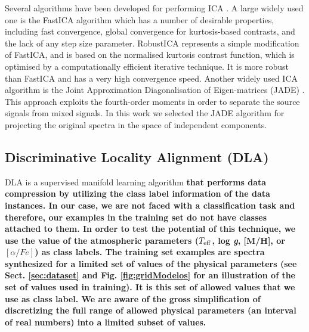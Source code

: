 \documentclass[a4paper,fleqn,usenatbib]{mnras}
\begin{document}
Several algorithms have been developed for performing ICA
\citep{bell:95,belouchrani:97,ollila:06,li:08}. A large widely used
one is the FastICA algorithm \citep{hyvarinen:00} which has a number
of desirable properties, including fast convergence, global
convergence for kurtosis-based contrasts, and the lack of any step
size parameter.  RobustICA \citep{zarzoso:10} represents a simple
modification of FastICA, and is based on the normalised kurtosis
contrast function, which is optimised by a computationally efficient
iterative technique. It is more robust than FastICA and has a very
high convergence speed.  Another widely used ICA algorithm is the
Joint Approximation Diagonalisation of Eigen-matrices (JADE)
\citep{cardoso:93}. This approach exploits the fourth-order moments in
order to separate the source signals from mixed signals. In this work
we selected the JADE algorithm for projecting the original spectra in
the space of independent components.

\subsection{Discriminative Locality Alignment (DLA)}
DLA \citep{zhang:2008} is a supervised manifold learning algorithm {\bf that 
performs data compression by utilizing the class label information of the 
data instances. In our case, we are not faced with a classification task and 
therefore, our examples in the training set do not have classes attached to 
them. In order to test the potential of this technique, we use the value of the 
atmospheric parameters ($T_{\rm eff}$, log \textit{g}, [M/H], or 
$\left[ \alpha/Fe \right]$) as class labels. The training set examples are 
spectra synthesized for a limited set of values of the physical parameters 
(see Sect. \ref{sec:dataset} and Fig. \ref{fig:gridModelos} for an illustration 
of the set of values used in training). It is this set of allowed values that we use as 
class label. We are aware of the gross simplification of discretizing the full 
range of allowed physical parameters (an interval of real numbers) into a 
limited subset of values.
}
\end{document}
